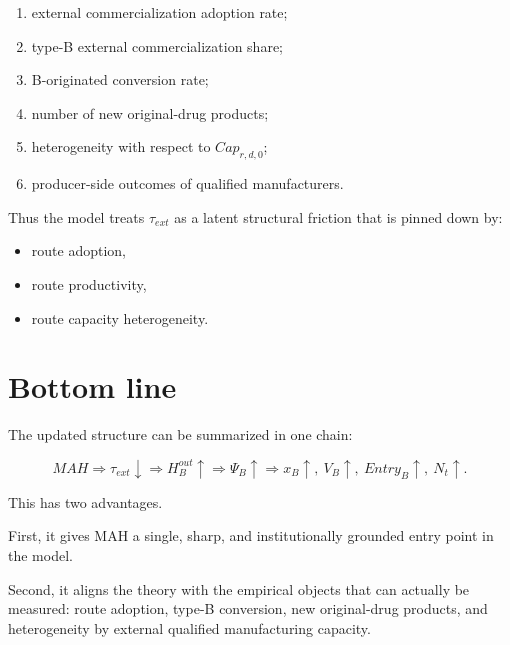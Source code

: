 \documentclass[12pt]{article}
\begin{document}
\begin{enumerate}[leftmargin=2em]
    \item external commercialization adoption rate;
    \item type-B external commercialization share;
    \item B-originated conversion rate;
    \item number of new original-drug products;
    \item heterogeneity with respect to \(Cap_{r,d,0}\);
    \item producer-side outcomes of qualified manufacturers.
\end{enumerate}

Thus the model treats \(\tau_{ext}\) as a latent structural friction that is pinned down by:
\begin{itemize}[leftmargin=2em]
    \item route adoption,
    \item route productivity,
    \item route capacity heterogeneity.
\end{itemize}

\section{Bottom line}

The updated structure can be summarized in one chain:

\[
MAH
\Rightarrow
\tau_{ext}\downarrow
\Rightarrow
H_B^{out}\uparrow
\Rightarrow
\Psi_B\uparrow
\Rightarrow
x_B\uparrow,\ V_B\uparrow,\ Entry_B\uparrow,\ N_t\uparrow.
\]

This has two advantages.

First, it gives MAH a single, sharp, and institutionally grounded entry point in the model.

Second, it aligns the theory with the empirical objects that can actually be measured:
route adoption, type-B conversion, new original-drug products, and heterogeneity by external
qualified manufacturing capacity.
\end{document}

